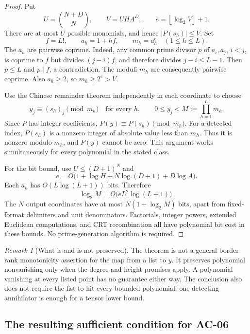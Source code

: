 \documentclass[11pt]{article}
\theoremstyle{definition}
\theoremstyle{remark}
\newtheorem{remark}[theorem]{Remark}
\newcommand{\floor}[1]{\left\lfloor #1\right\rfloor}
\begin{document}
\begin{proof}
Put
\[
 U=\binom{N+D}{N},\qquad V=UH A^D,\qquad e=\floor{\log_2V}+1.
\]
There are at most $U$ possible monomials, and hence $|P(s_h)|\le V$. Set
\begin{equation}\label{eq:moduli}
 f=L!,\qquad a_h=1+hf,\qquad m_h=a_h^e\quad(1\le h\le L).
\end{equation}
The $a_h$ are pairwise coprime. Indeed, any common prime divisor $p$ of $a_i,a_j$, $i<j$, is coprime to $f$ but divides $(j-i)f$, and therefore divides $j-i\le L-1$. Then $p\le L$ and $p\mid f$, a contradiction. The moduli $m_h$ are consequently pairwise coprime. Also $a_h\ge2$, so $m_h\ge2^e>V$.

Use the Chinese remainder theorem independently in each coordinate to choose
\[
 y_j\equiv(s_h)_j\pmod{m_h}\quad\text{for every }h,
 \qquad 0\le y_j<M:=\prod_{h=1}^Lm_h.
\]
Since $P$ has integer coefficients, $P(y)\equiv P(s_h)\pmod{m_h}$. For a detected index, $P(s_h)$ is a nonzero integer of absolute value less than $m_h$. Thus it is nonzero modulo $m_h$, and $P(y)$ cannot be zero. This argument works simultaneously for every polynomial in the stated class.

For the bit bound, use $U\le(D+1)^N$ and
\[
 e=O\bigl(1+\log H+N\log(D+1)+D\log A\bigr).
\]
Each $a_h$ has $O(L\log(L+1))$ bits. Therefore
\begin{equation}\label{eq:crtbits}
 \log_2 M=O\bigl(eL^2\log(L+1)\bigr).
\end{equation}
The $N$ output coordinates have at most $N(1+\log_2M)$ bits, apart from fixed-format delimiters and unit denominators. Factorials, integer powers, extended Euclidean computations, and CRT recombination all have polynomial bit cost in these bounds. No prime-generation algorithm is required.
\end{proof}

\begin{remark}[What is and is not preserved]
The theorem is not a general border-rank monotonicity assertion for the map from a list to $y$. It preserves polynomial nonvanishing only when the degree and height promises apply. A polynomial vanishing at every listed point has no guarantee either way. The conclusion also does not require the list to hit every bounded polynomial: one detecting annihilator is enough for a tensor lower bound.
\end{remark}

\subsection{The resulting sufficient condition for AC-06}
\end{document}
